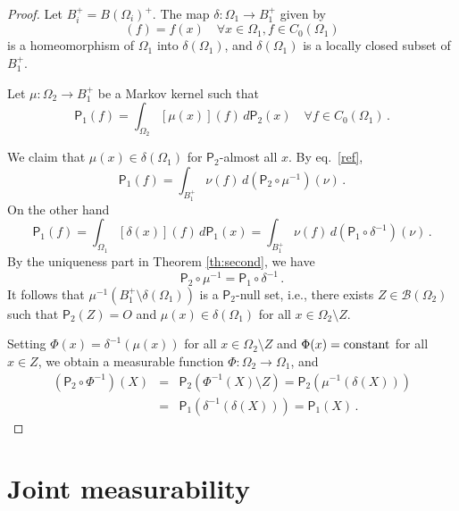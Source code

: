 \documentclass[12pt]{amsart}
\theoremstyle{definition}
\newcommand{\nil}{O} %
\newcommand{\PP}{\mathsf{P}} %
\newcommand{\bor}[1]{\mathcal{B}(#1)} %
\newcommand{\de}{\, d}
\newcommand{\frecc}{\rightarrow}
\begin{document}
\begin{proof}
Let $B_i^+ = B(\Omega_i)^+$. The map $\delta : \Omega_1 \frecc B_1^+$ given by
\begin{equation*}
[\delta (x)] (f) = f(x) \quad \forall x\in \Omega_1, f\in C_0 (\Omega_1)
\end{equation*}
is a homeomorphism of $\Omega_1$ into $\delta(\Omega_1)$, and $\delta(\Omega_1)$ is a locally closed subset of $B_1^+$.

Let $\mu : \Omega_2 \frecc B_1^+$ be a Markov kernel such that
\begin{equation}\label{ref}
\PP_1 (f) = \int_{\Omega_2} [\mu (x)] (f) \de \PP_2 (x) \quad \forall f\in C_0 (\Omega_1) \, .
\end{equation}

We claim that $\mu(x) \in \delta(\Omega_1)$ for $\PP_2$-almost all $x$. By eq.~\eqref{ref},
\begin{equation*}
\PP_1 (f) = \int_{B^+_1} \nu (f) \de (\PP_2 \circ \mu^{-1}) (\nu) \, .
\end{equation*}
On the other hand
\begin{equation*}
\PP_1 (f) = \int_{\Omega_1} [\delta (x)] (f) \de \PP_1 (x) = \int_{B^+_1} \nu (f) \de (\PP_1 \circ \delta^{-1}) (\nu) \, .
\end{equation*}
By the uniqueness part in Theorem \ref{th:second}, we have
\begin{equation*}
\PP_2 \circ \mu^{-1} = \PP_1 \circ \delta^{-1} \, .
\end{equation*}
It follows that $\mu^{-1} (B^+_1 \setminus \delta(\Omega_1) )$ is a $\PP_2$-null set, i.e., there exists $Z\in\bor{\Omega_2}$ such that $\PP_2 (Z) = \nil$ and $\mu(x) \in \delta(\Omega_1)$ for all $x\in \Omega_2 \setminus Z$.

Setting $\Phi(x) = \delta^{-1} (\mu(x))$ for all $x\in \Omega_2 \setminus Z$ and $\Phi(x) = {\rm constant}$ for all $x\in Z$, we obtain a measurable function $\Phi : \Omega_2 \frecc \Omega_1$, and
\begin{eqnarray*}
(\PP_2 \circ \Phi^{-1} )(X) & = & \PP_2 (\Phi^{-1} (X) \setminus Z) = \PP_2 (\mu^{-1} (\delta(X)) ) \\
& = & \PP_1 (\delta^{-1} (\delta(X)) ) = \PP_1 (X) \, .
\end{eqnarray*}
\end{proof}

\section{Joint measurability}\label{sec:joint}
\end{document}
